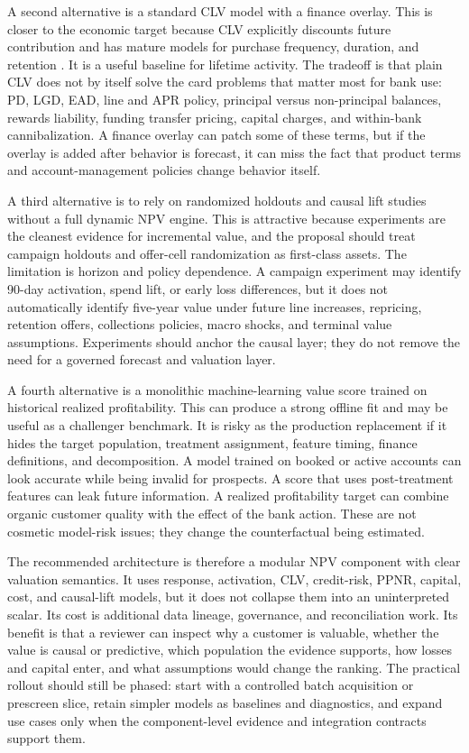 \documentclass[11pt]{article}
\newcommand{\1}{\mathbf{1}}
\begin{document}
A second alternative is a standard CLV model with a finance overlay. This is
closer to the economic target because CLV explicitly discounts future
contribution and has mature models for purchase frequency, duration, and
retention \citep{berger1998clv,rust2004return,venkatesan2004clv,
schmittlein1987counting,fader2005bgnbd}. It is a useful baseline for lifetime
activity. The tradeoff is that plain CLV does not by itself solve the card
problems that matter most for bank use: PD, LGD, EAD, line and APR policy,
principal versus non-principal balances, rewards liability, funding transfer
pricing, capital charges, and within-bank cannibalization. A finance overlay
can patch some of these terms, but if the overlay is added after behavior is
forecast, it can miss the fact that product terms and account-management
policies change behavior itself.

A third alternative is to rely on randomized holdouts and causal lift studies
without a full dynamic NPV engine. This is attractive because experiments are
the cleanest evidence for incremental value, and the proposal should treat
campaign holdouts and offer-cell randomization as first-class assets. The
limitation is horizon and policy dependence. A campaign experiment may
identify 90-day activation, spend lift, or early loss differences, but it does
not automatically identify five-year value under future line increases,
repricing, retention offers, collections policies, macro shocks, and terminal
value assumptions. Experiments should anchor the causal layer; they do not
remove the need for a governed forecast and valuation layer.

A fourth alternative is a monolithic machine-learning value score trained on
historical realized profitability. This can produce a strong offline fit and
may be useful as a challenger benchmark. It is risky as the production
replacement if it hides the target population, treatment assignment, feature
timing, finance definitions, and decomposition. A model trained on booked or
active accounts can look accurate while being invalid for prospects. A score
that uses post-treatment features can leak future information. A realized
profitability target can combine organic customer quality with the effect of
the bank action. These are not cosmetic model-risk issues; they change the
counterfactual being estimated.

The recommended architecture is therefore a modular NPV component with clear
valuation semantics. It uses response, activation, CLV, credit-risk, PPNR,
capital, cost, and causal-lift models, but it does not collapse them into an
uninterpreted scalar. Its cost is additional data lineage, governance, and
reconciliation work. Its benefit is that a reviewer can inspect why a customer
is valuable, whether the value is causal or predictive, which population the
evidence supports, how losses and capital enter, and what assumptions would
change the ranking. The practical rollout should still be phased: start with a
controlled batch acquisition or prescreen slice, retain simpler models as
baselines and diagnostics, and expand use cases only when the component-level
evidence and integration contracts support them.
\end{document}
